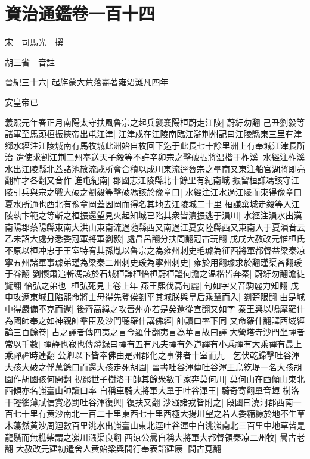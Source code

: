 \chapter{資治通鑑卷一百十四}


宋　司馬光　撰

胡三省　音註

晉紀三十六|{
	起旃蒙大荒落盡著雍涒灘凡四年}


安皇帝已

義熙元年春正月南陽太守扶風魯宗之起兵襲襄陽桓蔚走江陵|{
	蔚紆勿翻}
己丑劉毅等諸軍至馬頭桓振挾帝出屯江津|{
	江津戍在江陵南臨江滸荆州記曰江陵縣東三里有津鄉水經注江陵城南有馬牧城此洲始自枚回下迄于此長七十餘里洲上有奉城江津長所治}
遣使求割江荆二州奉送天子毅等不許辛卯宗之擊破振將温楷于柞溪|{
	水經注柞溪水出江陵縣北蓋諸池散流咸所會合積以成川東流逕魯宗之壘南又東注船官湖將即亮翻柞才各翻又音作}
進屯紀南|{
	郡國志江陵縣北十餘里有紀南城}
振留桓謙馮該守江陵引兵與宗之戰大破之劉毅等擊破馮該於豫章口|{
	水經注江水過江陵而東得豫章口夏水所通也西北有豫章岡蓋因岡而得名其地去江陵城二十里}
桓謙棄城走毅等入江陵執卞範之等斬之桓振還望見火起知城已陷其衆皆潰振逃于溳川|{
	水經注溳水出漢南陽郡蔡陽縣東南大洪山東南流過隨縣西又南過江夏安陸縣西又東南入于夏溳音云}
乙未詔大處分悉委冠軍將軍劉毅|{
	處昌呂翻分扶問翻冠古玩翻}
戊戌大赦改元惟桓氏不原以桓冲忠于王室特宥其孫胤以魯宗之為雍州刺史毛璩為征西將軍都督益梁秦凉寧五州諸軍事璩弟瑾為梁秦二州刺史瑗為寧州刺史|{
	雍於用翻璩求於翻瑾渠吝翻瑗于眷翻}
劉懷肅追斬馮該於石城桓謙桓怡桓蔚桓謐何澹之温楷皆奔秦|{
	蔚紆勿翻澹徒覽翻}
怡弘之弟也|{
	桓弘死見上卷上年}
燕王熙伐高句麗|{
	句如字又音駒麗力知翻}
戊申攻遼東城且陷熙命將士毋得先登俟剗平其城朕與皇后乘輦而入|{
	剗楚限翻}
由是城中得嚴備不克而還|{
	後齊高緯之攻晉州亦若是矣還從宣翻又如字}
秦王興以鳩摩羅什為國師奉之如神親帥羣臣及沙門聽羅什講佛經|{
	帥讀曰率下同}
又命羅什翻譯西域經論三百餘卷|{
	古之譯者傳四夷之言今羅什翻夷言為華言故曰譯}
大營塔寺沙門坐禪者常以千數|{
	禪静也寂也傳燈録曰禪有五有凡夫禪有外道禪有小乘禪有大乘禪有最上乘禪禪時連翻}
公卿以下皆奉佛由是州郡化之事佛者十室而九　乞伏乾歸擊吐谷渾大孩大破之俘萬餘口而還大孩走死胡園|{
	晉書吐谷渾傳吐谷渾王烏紇堤一名大孩胡園作胡國孩何開翻}
視羆世子樹洛干帥其餘衆數千家奔莫何川|{
	莫何山在西傾山東北西傾亦名嵹臺山帥讀曰率}
自稱車騎大將軍大單于吐谷渾王|{
	騎奇寄翻單音蟬}
樹洛干輕徭薄賦信賞必罰吐谷渾復興|{
	復扶又翻}
沙漒諸戎皆附之|{
	段國曰澆河郡西南一百七十里有黄沙南北一百二十里東西七十里西極大揚川望之若人委糒糠於地不生草木蕩然黄沙周迴數百里洮水出嵹臺山東北逕吐谷渾中自洮嵹南北三百里中地草皆是龍鬚而無樵柴謂之嵹川漒渠良翻}
西涼公暠自稱大將軍大都督領秦凉二州牧|{
	暠古老翻}
大赦改元建初遣舍人黄始梁興間行奉表詣建康|{
	間古莧翻}
